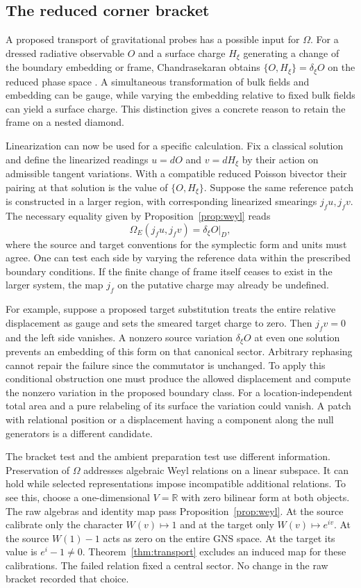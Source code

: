 \documentclass[11pt,letterpaper]{article}
\begin{document}
\subsection{The reduced corner bracket}

A proposed transport of gravitational probes has a possible input for $\Omega$. For a dressed radiative observable $O$ and a surface charge $H_\xi$ generating a change of the boundary embedding or frame, Chandrasekaran obtains $\{O,H_\xi\}=\delta_\xi O$ on the reduced phase space \cite[Eqs.~(3.32)--(3.33)]{nc}. A simultaneous transformation of bulk fields and embedding can be gauge, while varying the embedding relative to fixed bulk fields can yield a surface charge. This distinction gives a concrete reason to retain the frame on a nested diamond.

Linearization can now be used for a specific calculation. Fix a classical solution and define the linearized readings $u=dO$ and $v=dH_\xi$ by their action on admissible tangent variations. With a compatible reduced Poisson bivector their pairing at that solution is the value of $\{O,H_\xi\}$. Suppose the same reference patch is constructed in a larger region, with corresponding linearized smearings $j_fu,j_fv$. The necessary equality given by Proposition~\ref{prop:weyl} reads
\[
  \Omega_E(j_fu,j_fv)=\delta_\xi O\big|_D ,
\]
where the source and target conventions for the symplectic form and units must agree. One can test each side by varying the reference data within the prescribed boundary conditions. If the finite change of frame itself ceases to exist in the larger system, the map $j_f$ on the putative charge may already be undefined.

For example, suppose a proposed target substitution treats the entire relative displacement as gauge and sets the smeared target charge to zero. Then $j_fv=0$ and the left side vanishes. A nonzero source variation $\delta_\xi O$ at even one solution prevents an embedding of this form on that canonical sector. Arbitrary rephasing cannot repair the failure since the commutator is unchanged. To apply this conditional obstruction one must produce the allowed displacement and compute the nonzero variation in the proposed boundary class. For a location-independent total area and a pure relabeling of its surface the variation could vanish. A patch with relational position or a displacement having a component along the null generators is a different candidate.

The bracket test and the ambient preparation test use different information. Preservation of $\Omega$ addresses algebraic Weyl relations on a linear subspace. It can hold while selected representations impose incompatible additional relations. To see this, choose a one-dimensional $V=\mathbb R$ with zero bilinear form at both objects. The raw algebras and identity map pass Proposition~\ref{prop:weyl}. At the source calibrate only the character $W(v)\mapsto1$ and at the target only $W(v)\mapsto e^{iv}$. At the source $W(1)-1$ acts as zero on the entire GNS space. At the target its value is $e^{i}-1\ne0$. Theorem~\ref{thm:transport} excludes an induced map for these calibrations. The failed relation fixed a central sector. No change in the raw bracket recorded that choice.
\end{document}
